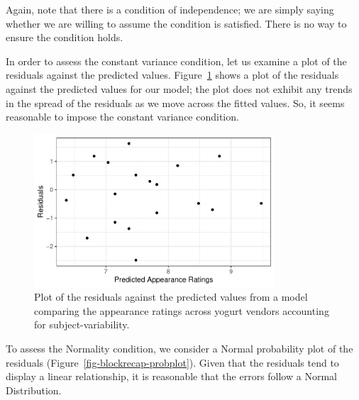 \documentclass[
  letterpaper,
  DIV=11,
  numbers=noendperiod]{scrreprt}
\theoremstyle{definition}
\theoremstyle{definition}
\theoremstyle{plain}
\theoremstyle{remark}
\begin{document}
Again, note that there is a condition of independence; we are simply
saying whether we are willing to assume the condition is satisfied.
There is no way to ensure the condition holds.

In order to assess the constant variance condition, let us examine a
plot of the residuals against the predicted values.
Figure~\ref{fig-blockrecap-resids} shows a plot of the residuals against
the predicted values for our model; the plot does not exhibit any trends
in the spread of the residuals as we move across the fitted values. So,
it seems reasonable to impose the constant variance condition.

\begin{figure}

{\centering \includegraphics[width=0.8\textwidth,height=\textheight]{./images/fig-blockrecap-resids-1.pdf}

}

\caption{\label{fig-blockrecap-resids}Plot of the residuals against the
predicted values from a model comparing the appearance ratings across
yogurt vendors accounting for subject-variability.}

\end{figure}

To assess the Normality condition, we consider a Normal probability plot
of the residuals (Figure~\ref{fig-blockrecap-probplot}). Given that the
residuals tend to display a linear relationship, it is reasonable that
the errors follow a Normal Distribution.
\end{document}
